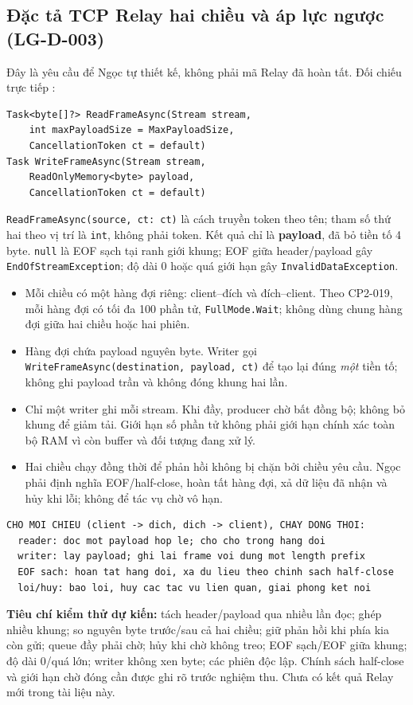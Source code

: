 \documentclass[12pt,a4paper]{article}
\begin{document}
\subsection{Đặc tả TCP Relay hai chiều và áp lực ngược (LG-D-003)}
Đây là yêu cầu để Ngọc tự thiết kế, không phải mã Relay đã hoàn tất. Đối chiếu trực tiếp :
\begin{lstlisting}[language=CSharp,caption={Chữ ký hiện có, không phải thuật toán Relay}]
Task<byte[]?> ReadFrameAsync(Stream stream,
    int maxPayloadSize = MaxPayloadSize,
    CancellationToken ct = default)
Task WriteFrameAsync(Stream stream,
    ReadOnlyMemory<byte> payload,
    CancellationToken ct = default)
\end{lstlisting}
\texttt{ReadFrameAsync(source, ct: ct)} là cách truyền token theo tên; tham số thứ hai theo vị trí là \texttt{int}, không phải token. Kết quả chỉ là \textbf{payload}, đã bỏ tiền tố 4 byte. \texttt{null} là EOF sạch tại ranh giới khung; EOF giữa header/payload gây \texttt{EndOfStreamException}; độ dài 0 hoặc quá giới hạn gây \texttt{InvalidDataException}.

\begin{itemize}
\item Mỗi chiều có một hàng đợi riêng: client--đích và đích--client. Theo CP2-019, mỗi hàng đợi có tối đa 100 phần tử, \texttt{FullMode.Wait}; không dùng chung hàng đợi giữa hai chiều hoặc hai phiên.
\item Hàng đợi chứa payload nguyên byte. Writer gọi \texttt{WriteFrameAsync(destination, payload, ct)} để tạo lại đúng \emph{một} tiền tố; không ghi payload trần và không đóng khung hai lần.
\item Chỉ một writer ghi mỗi stream. Khi đầy, producer chờ bất đồng bộ; không bỏ khung để giảm tải. Giới hạn số phần tử không phải giới hạn chính xác toàn bộ RAM vì còn buffer và đối tượng đang xử lý.
\item Hai chiều chạy đồng thời để phản hồi không bị chặn bởi chiều yêu cầu. Ngọc phải định nghĩa EOF/half-close, hoàn tất hàng đợi, xả dữ liệu đã nhận và hủy khi lỗi; không để tác vụ chờ vô hạn.
\end{itemize}
\begin{lstlisting}[caption={Pseudocode định hướng, không cung cấp cài đặt hoàn chỉnh}]
CHO MOI CHIEU (client -> dich, dich -> client), CHAY DONG THOI:
  reader: doc mot payload hop le; cho cho trong hang doi
  writer: lay payload; ghi lai frame voi dung mot length prefix
  EOF sach: hoan tat hang doi, xa du lieu theo chinh sach half-close
  loi/huy: bao loi, huy cac tac vu lien quan, giai phong ket noi
\end{lstlisting}
\textbf{Tiêu chí kiểm thử dự kiến:} tách header/payload qua nhiều lần đọc; ghép nhiều khung; so nguyên byte trước/sau cả hai chiều; giữ phản hồi khi phía kia còn gửi; queue đầy phải chờ; hủy khi chờ không treo; EOF sạch/EOF giữa khung; độ dài 0/quá lớn; writer không xen byte; các phiên độc lập. Chính sách half-close và giới hạn chờ đóng cần được ghi rõ trước nghiệm thu. Chưa có kết quả Relay mới trong tài liệu này.
\end{document}

